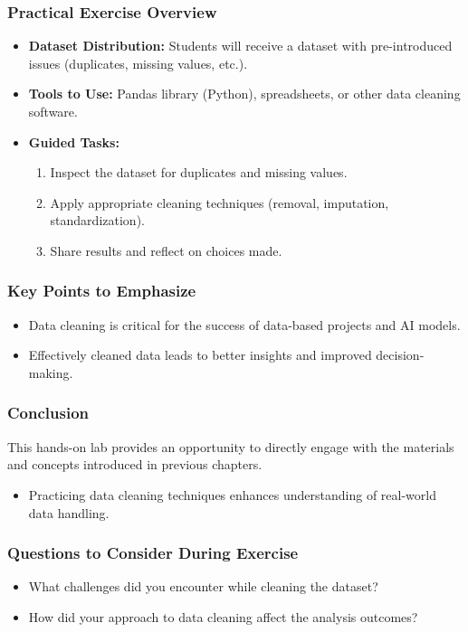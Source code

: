 \documentclass[aspectratio=169]{beamer}
\begin{document}
\begin{frame}
    \frametitle{Practical Exercise Overview}
    \begin{itemize}
        \item \textbf{Dataset Distribution:} 
            Students will receive a dataset with pre-introduced issues (duplicates, missing values, etc.).
        \item \textbf{Tools to Use:} 
            Pandas library (Python), spreadsheets, or other data cleaning software.
        \item \textbf{Guided Tasks:} 
            \begin{enumerate}
                \item Inspect the dataset for duplicates and missing values.
                \item Apply appropriate cleaning techniques (removal, imputation, standardization).
                \item Share results and reflect on choices made.
            \end{enumerate}
    \end{itemize}
\end{frame}

\begin{frame}
    \frametitle{Key Points to Emphasize}
    \begin{itemize}
        \item Data cleaning is critical for the success of data-based projects and AI models.
        \item Effectively cleaned data leads to better insights and improved decision-making.
    \end{itemize}
\end{frame}

\begin{frame}
    \frametitle{Conclusion}
    This hands-on lab provides an opportunity to directly engage with the materials and concepts introduced in previous chapters. 
    \begin{itemize}
        \item Practicing data cleaning techniques enhances understanding of real-world data handling.
    \end{itemize}
\end{frame}

\begin{frame}
    \frametitle{Questions to Consider During Exercise}
    \begin{itemize}
        \item What challenges did you encounter while cleaning the dataset?
        \item How did your approach to data cleaning affect the analysis outcomes?
    \end{itemize}
\end{frame}
\end{document}
